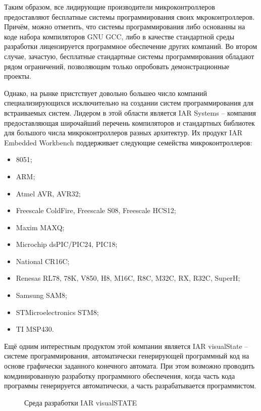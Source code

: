 Таким образом, все лидирующие производители микроконтроллеров предоставляют
бесплатные системы программирования своих мкроконтроллеров.
Причём, можно отметить, что системы программирования либо основанны на коде 
набора компиляторов GNU GCC, либо в качестве стандартной среды разработки лицензируется
программное обеспечение других компаний. Во втором случае, зачастую, бесплатные
стандартные системы программирования обладают рядом ограничений, позволяющим только
опробовать демонстрационные проекты.

Однако, на рынке пристствует довольно большео число компаний специализирующихся
исключительно на создании систем программирования для встраиваемых систем. Лидером
в этой области является IAR Systems -- компания предоставляющая широчайший перечень компиляторов и стандартных библиотек для большого числа микроконтроллеров разных архитектур.
Их продукт IAR Embedded Workbench поддерживает следующие семейства микроконтроллеров:
\begin{itemize}
	\item{} 8051;
	\item{} ARM;
	\item{} Atmel AVR, AVR32;
	\item{} Freescale ColdFire, Freescale S08, Freescale HCS12;
	\item{} Maxim MAXQ;
	\item{} Microchip dsPIC/PIC24, PIC18;
	\item{} National CR16C;
	\item{} Renesas RL78, 78K, V850, H8, M16C, R8C, M32C, RX, R32C, SuperH;
	\item{} Samsung SAM8;
	\item{} STMicroelectronics STM8;
	\item{} TI MSP430.
\end{itemize}
Ещё одним интерестным продуктом этой компании является IAR visualState -- системе
программирования, автоматически генерирующей программный код на основе графически
заданного конечного автомата. При этом возможно проводить комдинированную разработку
программного обеспечения, когда часть кода программы генерируется автоматически, а часть
разрабатывается программистом.

\begin{figure}[h]
	\caption{Среда разработки IAR visualSTATE}
	\label{img:iarVis}
\end{figure}

\newpage{}

